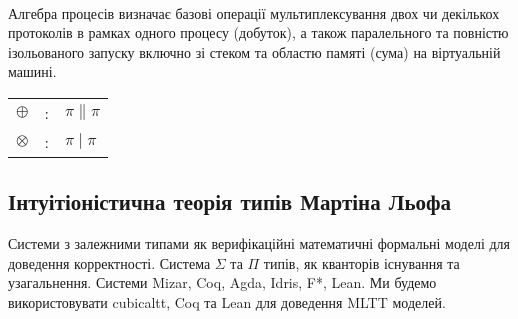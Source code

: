 \begin{prooftree}
\end{prooftree}

\begin{prooftree}
\end{prooftree}

\begin{prooftree}
\end{prooftree}
\paragraph{}

    \paragraph{}
    Алгебра процесів визначає базові операції мультиплексування двох чи декількох
    протоколів в рамках одного процесу (добуток), а також паралельного та повністю
    ізольованого запуску включно зі стеком та областю памяті (сума) на
    віртуальній машині.

\begin{center}
\begin{tabular}{lcl}
$\oplus$   &:& $\pi \parallel \pi$\\
$\otimes$  &:& $\pi \mid \pi$\\
\end{tabular}
\end{center}

\newpage
    \subsection{Інтуітіоністична теорія типів Мартіна Льофа}
    Системи з залежними типами як верифікаційні математичні формальні моделі
    для доведення корректності. Система $\Sigma$ та $\Pi$ типів, як кванторів
    існування та узагальнення. Системи Mizar, Coq, Agda, Idris, F*, Lean. Ми будемо
    використовувати cubicaltt, Coq та Lean для доведення MLTT моделей.

